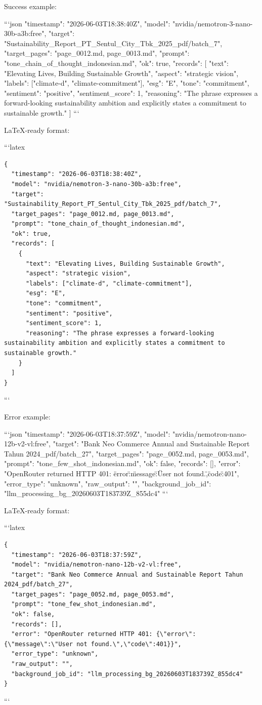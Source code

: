 Success example:

```json
{
  "timestamp": "2026-06-03T18:38:40Z",
  "model": "nvidia/nemotron-3-nano-30b-a3b:free",
  "target": "Sustainability_Report_PT_Sentul_City_Tbk_2025_pdf/batch_7",
  "target_pages": "page_0012.md, page_0013.md",
  "prompt": "tone_chain_of_thought_indonesian.md",
  "ok": true,
  "records": [
    {
      "text": "Elevating Lives, Building Sustainable Growth",
      "aspect": "strategic vision",
      "labels": ["climate-d", "climate-commitment"],
      "esg": "E",
      "tone": "commitment",
      "sentiment": "positive",
      "sentiment_score": 1,
      "reasoning": "The phrase expresses a forward-looking sustainability ambition and explicitly states a commitment to sustainable growth."
    }
  ]
}
```

LaTeX-ready format:

```latex
\begin{verbatim}
{
  "timestamp": "2026-06-03T18:38:40Z",
  "model": "nvidia/nemotron-3-nano-30b-a3b:free",
  "target": "Sustainability_Report_PT_Sentul_City_Tbk_2025_pdf/batch_7",
  "target_pages": "page_0012.md, page_0013.md",
  "prompt": "tone_chain_of_thought_indonesian.md",
  "ok": true,
  "records": [
    {
      "text": "Elevating Lives, Building Sustainable Growth",
      "aspect": "strategic vision",
      "labels": ["climate-d", "climate-commitment"],
      "esg": "E",
      "tone": "commitment",
      "sentiment": "positive",
      "sentiment_score": 1,
      "reasoning": "The phrase expresses a forward-looking sustainability ambition and explicitly states a commitment to sustainable growth."
    }
  ]
}
\end{verbatim}
```

Error example:

```json
{
  "timestamp": "2026-06-03T18:37:59Z",
  "model": "nvidia/nemotron-nano-12b-v2-vl:free",
  "target": "Bank Neo Commerce Annual and Sustainable Report Tahun 2024_pdf/batch_27",
  "target_pages": "page_0052.md, page_0053.md",
  "prompt": "tone_few_shot_indonesian.md",
  "ok": false,
  "records": [],
  "error": "OpenRouter returned HTTP 401: {\"error\":{\"message\":\"User not found.\",\"code\":401}}",
  "error_type": "unknown",
  "raw_output": "",
  "background_job_id": "llm_processing_bg_20260603T183739Z_855dc4"
}
```

LaTeX-ready format:

```latex
\begin{verbatim}
{
  "timestamp": "2026-06-03T18:37:59Z",
  "model": "nvidia/nemotron-nano-12b-v2-vl:free",
  "target": "Bank Neo Commerce Annual and Sustainable Report Tahun 2024_pdf/batch_27",
  "target_pages": "page_0052.md, page_0053.md",
  "prompt": "tone_few_shot_indonesian.md",
  "ok": false,
  "records": [],
  "error": "OpenRouter returned HTTP 401: {\"error\":{\"message\":\"User not found.\",\"code\":401}}",
  "error_type": "unknown",
  "raw_output": "",
  "background_job_id": "llm_processing_bg_20260603T183739Z_855dc4"
}
\end{verbatim}
```

